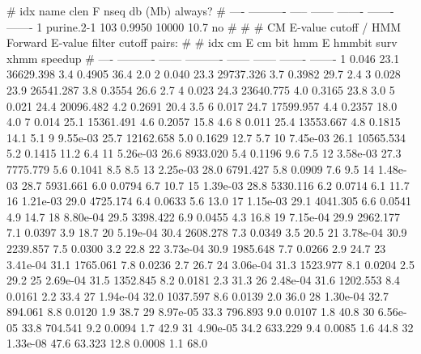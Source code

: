 \begin{sreoutput}
#  idx  name         clen       F     nseq  db (Mb)  always?
# ----  ----------  -----  ------  -------  -------  -------
     1  purine.2-1    103  0.9950    10000     10.7       no
#
#
#       CM E-value cutoff / HMM Forward E-value filter cutoff pairs:
#
#       idx         cm E  cm bit       hmm E  hmmbit    surv     xhmm  speedup
#       ----  ----------  ------  ----------  ------  ------  -------  -------
           1       0.046    23.1   36629.398     3.4  0.4905     36.4      2.0
           2       0.040    23.3   29737.326     3.7  0.3982     29.7      2.4
           3       0.028    23.9   26541.287     3.8  0.3554     26.6      2.7
           4       0.023    24.3   23640.775     4.0  0.3165     23.8      3.0
           5       0.021    24.4   20096.482     4.2  0.2691     20.4      3.5
           6       0.017    24.7   17599.957     4.4  0.2357     18.0      4.0
           7       0.014    25.1   15361.491     4.6  0.2057     15.8      4.6
           8       0.011    25.4   13553.667     4.8  0.1815     14.1      5.1
           9    9.55e-03    25.7   12162.658     5.0  0.1629     12.7      5.7
          10    7.45e-03    26.1   10565.534     5.2  0.1415     11.2      6.4
          11    5.26e-03    26.6    8933.020     5.4  0.1196      9.6      7.5
          12    3.58e-03    27.3    7775.779     5.6  0.1041      8.5      8.5
          13    2.25e-03    28.0    6791.427     5.8  0.0909      7.6      9.5
          14    1.48e-03    28.7    5931.661     6.0  0.0794      6.7     10.7
          15    1.39e-03    28.8    5330.116     6.2  0.0714      6.1     11.7
          16    1.21e-03    29.0    4725.174     6.4  0.0633      5.6     13.0
          17    1.15e-03    29.1    4041.305     6.6  0.0541      4.9     14.7
          18    8.80e-04    29.5    3398.422     6.9  0.0455      4.3     16.8
          19    7.15e-04    29.9    2962.177     7.1  0.0397      3.9     18.7
          20    5.19e-04    30.4    2608.278     7.3  0.0349      3.5     20.5
          21    3.78e-04    30.9    2239.857     7.5  0.0300      3.2     22.8
          22    3.73e-04    30.9    1985.648     7.7  0.0266      2.9     24.7
          23    3.41e-04    31.1    1765.061     7.8  0.0236      2.7     26.7
          24    3.06e-04    31.3    1523.977     8.1  0.0204      2.5     29.2
          25    2.69e-04    31.5    1352.845     8.2  0.0181      2.3     31.3
          26    2.48e-04    31.6    1202.553     8.4  0.0161      2.2     33.4
          27    1.94e-04    32.0    1037.597     8.6  0.0139      2.0     36.0
          28    1.30e-04    32.7     894.061     8.8  0.0120      1.9     38.7
          29    8.97e-05    33.3     796.893     9.0  0.0107      1.8     40.8
          30    6.56e-05    33.8     704.541     9.2  0.0094      1.7     42.9
          31    4.90e-05    34.2     633.229     9.4  0.0085      1.6     44.8
          32    1.33e-08    47.6      63.323    12.8  0.0008      1.1     68.0
\end{sreoutput}

